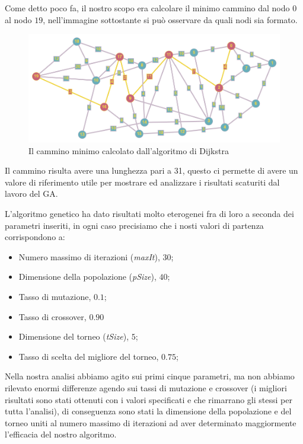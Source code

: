 Come detto poco fa, il nostro scopo era calcolare il minimo cammino dal nodo $0$ al nodo $19$, nell'immagine sottostante si pu\`o osservare da quali nodi sia formato.
\begin{figure}[H]
    \centering
    \hfill
    \includegraphics[width=1\textwidth]{Images/path.png}
    \hspace*{\fill}
    \caption{Il cammino minimo calcolato dall'algoritmo di Dijkstra}
    \label{fig:path}
\end{figure}
Il cammino risulta avere una lunghezza pari a 31, questo ci permette di avere un valore di riferimento utile per mostrare ed analizzare i risultati scaturiti dal lavoro del GA.
\vspace{3mm}

L'algoritmo genetico ha dato risultati molto eterogenei fra di loro a seconda dei parametri inseriti, in ogni caso precisiamo che i nosti valori di partenza corrispondono a:
\begin{itemize}
    \item Numero massimo di iterazioni (\textit{maxIt}), $30$;
    \item Dimensione della popolazione (\textit{pSize}), $40$;
    \item Tasso di mutazione, $0.1$;
    \item Tasso di crossover, $0.90$
    \item Dimensione del torneo (\textit{tSize}), $5$;
    \item Tasso di scelta del migliore del torneo, $0.75$;
\end{itemize}
Nella nostra analisi abbiamo agito sui primi cinque parametri, ma non abbiamo rilevato enormi differenze agendo sui tassi di mutazione e crossover (i migliori risultati sono stati ottenuti con i valori specificati e che rimarrano gli stessi per tutta l'analisi), di conseguenza sono stati la dimensione della popolazione  e del torneo uniti al numero massimo di iterazioni ad aver determinato maggiormente l'efficacia del nostro algoritmo.
\vspace{3mm}

